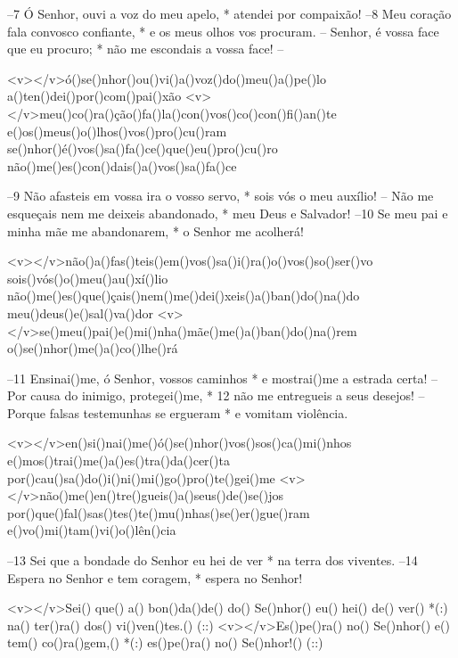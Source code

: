 –7 Ó Senhor, ouvi a voz do meu apelo, *
atendei por compaixão!
–8 Meu coração fala convosco confiante, *
e os meus olhos vos procuram.
– Senhor, é vossa face que eu procuro; *
não me escondais a vossa face! –

<v>\VSup{}</v>ó()se()nhor()ou()vi()a()voz()do()meu()a()pe()lo
a()ten()dei()por()com()pai()xão
<v>\VSup{}</v>meu()co()ra()ção()fa()la()con()vos()co()con()fi()an()te
e()os()meus()o()lhos()vos()pro()cu()ram
se()nhor()é()vos()sa()fa()ce()que()eu()pro()cu()ro
não()me()es()con()dais()a()vos()sa()fa()ce

–9 Não afasteis em vossa ira o vosso servo, *
sois vós o meu auxílio!
– Não me esqueçais nem me deixeis abandonado, *
meu Deus e Salvador!
–10 Se meu pai e minha mãe me abandonarem, *
o Senhor me acolherá!

<v>\VSup{}</v>não()a()fas()teis()em()vos()sa()i()ra()o()vos()so()ser()vo
sois()vós()o()meu()au()xí()lio
não()me()es()que()çais()nem()me()dei()xeis()a()ban()do()na()do
meu()deus()e()sal()va()dor
<v>\VSup{}</v>se()meu()pai()e()mi()nha()mãe()me()a()ban()do()na()rem
o()se()nhor()me()a()co()lhe()rá

–11 Ensinai()me, ó Senhor, vossos caminhos *
e mostrai()me a estrada certa!
– Por causa do inimigo, protegei()me, *
12 não me entregueis a seus desejos!
– Porque falsas testemunhas se ergueram *
e vomitam violência.

<v>\VSup{}</v>en()si()nai()me()ó()se()nhor()vos()sos()ca()mi()nhos
e()mos()trai()me()a()es()tra()da()cer()ta
por()cau()sa()do()i()ni()mi()go()pro()te()gei()me
<v>\VSup{}</v>não()me()en()tre()gueis()a()seus()de()se()jos
por()que()fal()sas()tes()te()mu()nhas()se()er()gue()ram
e()vo()mi()tam()vi()o()lên()cia

–13 Sei que a bondade do Senhor eu hei de ver *
na terra dos viventes.
–14 Espera no Senhor e tem coragem, *
espera no Senhor!

<v></v>Sei() que() a() bon()da()de() do() Se()nhor() eu() hei() de() ver() *(:)
na() ter()ra() dos() vi()ven()tes.() (::)
<v></v>Es()pe()ra() no() Se()nhor() e() tem() co()ra()gem,() *(:)
es()pe()ra() no() Se()nhor!() (::)